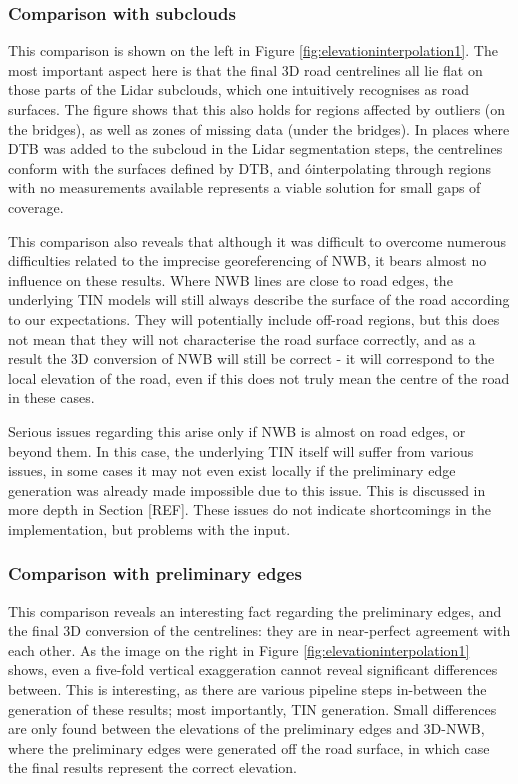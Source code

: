 \subsubsection{Comparison with subclouds}

This comparison is shown on the left in Figure \ref{fig:elevationinterpolation1}. The most important aspect here is that the final 3D road centrelines all lie flat on those parts of the Lidar subclouds, which one intuitively recognises as road surfaces. The figure shows that this also holds for regions affected by outliers (on the bridges), as well as zones of missing data (under the bridges). In places where DTB was added to the subcloud in the Lidar segmentation steps, the centrelines conform with the surfaces defined by DTB, and óinterpolating through regions with no measurements available represents a viable solution for small gaps of coverage.

This comparison also reveals that although it was difficult to overcome numerous difficulties related to the imprecise georeferencing of NWB, it bears almost no influence on these results. Where NWB lines are close to road edges, the underlying TIN models will still always describe the surface of the road according to our expectations. They will potentially include off-road regions, but this does not mean that they will not characterise the road surface correctly, and as a result the 3D conversion of NWB will still be correct - it will correspond to the local elevation of the road, even if this does not truly mean the centre of the road in these cases.

Serious issues regarding this arise only if NWB is almost on road edges, or beyond them. In this case, the underlying TIN itself will suffer from various issues, in some cases it may not even exist locally if the preliminary edge generation was already made impossible due to this issue. This is discussed in more depth in Section [REF]. These issues do not indicate shortcomings in the implementation, but problems with the input.

\subsubsection{Comparison with preliminary edges}

This comparison reveals an interesting fact regarding the preliminary edges, and the final 3D conversion of the centrelines: they are in near-perfect agreement with each other. As the image on the right in Figure \ref{fig:elevationinterpolation1} shows, even a five-fold vertical exaggeration cannot reveal significant differences between. This is interesting, as there are various pipeline steps in-between the generation of these results; most importantly, TIN generation. Small differences are only found between the elevations of the preliminary edges and 3D-NWB, where the preliminary edges were generated off the road surface, in which case the final results represent the correct elevation.

